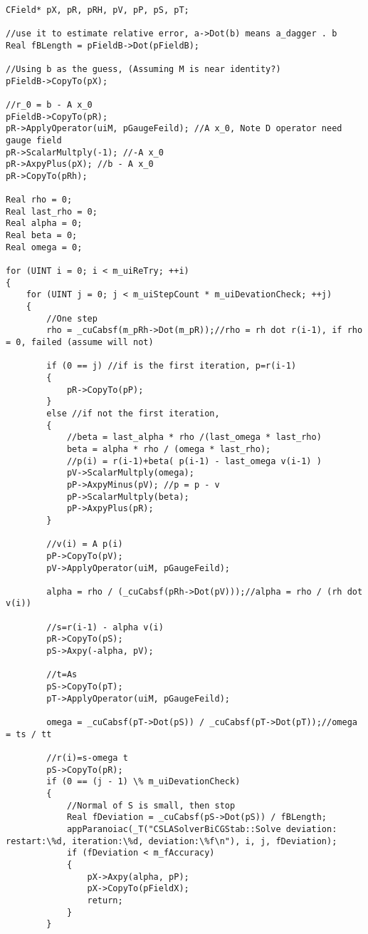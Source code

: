 \begin{lstlisting}

CField* pX, pR, pRH, pV, pP, pS, pT;

//use it to estimate relative error, a->Dot(b) means a_dagger . b
Real fBLength = pFieldB->Dot(pFieldB);

//Using b as the guess, (Assuming M is near identity?)
pFieldB->CopyTo(pX);

//r_0 = b - A x_0
pFieldB->CopyTo(pR);
pR->ApplyOperator(uiM, pGaugeFeild); //A x_0, Note D operator need gauge field
pR->ScalarMultply(-1); //-A x_0
pR->AxpyPlus(pX); //b - A x_0
pR->CopyTo(pRh);

Real rho = 0;
Real last_rho = 0;
Real alpha = 0;
Real beta = 0;
Real omega = 0;

for (UINT i = 0; i < m_uiReTry; ++i)
{
    for (UINT j = 0; j < m_uiStepCount * m_uiDevationCheck; ++j)
    {
        //One step
        rho = _cuCabsf(m_pRh->Dot(m_pR));//rho = rh dot r(i-1), if rho = 0, failed (assume will not)

        if (0 == j) //if is the first iteration, p=r(i-1)
        {
            pR->CopyTo(pP);
        }
        else //if not the first iteration,
        {
            //beta = last_alpha * rho /(last_omega * last_rho)
            beta = alpha * rho / (omega * last_rho);
            //p(i) = r(i-1)+beta( p(i-1) - last_omega v(i-1) )
            pV->ScalarMultply(omega);
            pP->AxpyMinus(pV); //p = p - v
            pP->ScalarMultply(beta);
            pP->AxpyPlus(pR);
        }

        //v(i) = A p(i)
        pP->CopyTo(pV);
        pV->ApplyOperator(uiM, pGaugeFeild);

        alpha = rho / (_cuCabsf(pRh->Dot(pV)));//alpha = rho / (rh dot v(i))

        //s=r(i-1) - alpha v(i)
        pR->CopyTo(pS);
        pS->Axpy(-alpha, pV);

        //t=As
        pS->CopyTo(pT);
        pT->ApplyOperator(uiM, pGaugeFeild);

        omega = _cuCabsf(pT->Dot(pS)) / _cuCabsf(pT->Dot(pT));//omega = ts / tt

        //r(i)=s-omega t
        pS->CopyTo(pR);
        if (0 == (j - 1) \% m_uiDevationCheck)
        {
            //Normal of S is small, then stop
            Real fDeviation = _cuCabsf(pS->Dot(pS)) / fBLength;
            appParanoiac(_T("CSLASolverBiCGStab::Solve deviation: restart:\%d, iteration:\%d, deviation:\%f\n"), i, j, fDeviation);
            if (fDeviation < m_fAccuracy)
            {
                pX->Axpy(alpha, pP);
                pX->CopyTo(pFieldX);
                return;
            }
        }


\end{lstlisting}
